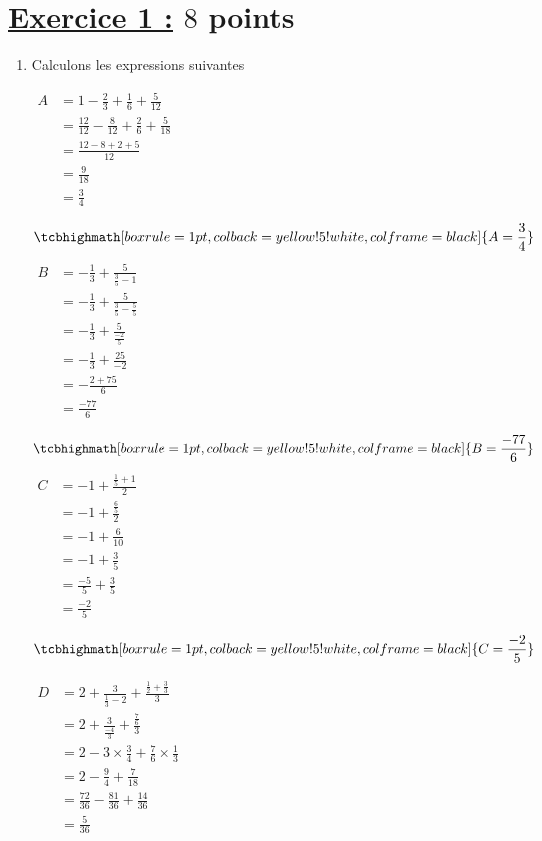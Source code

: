 \documentclass[12pt,a4paper]{article}
\begin{document}
\section*{\underline{Exercice 1 :} $8$ points}
\begin{enumerate}
    \item Calculons les expressions suivantes 
    
$
\begin{aligned}
A &= 1 - \frac{2}{3} + \frac{1}{6} + \frac{5}{12} \\
&= \frac{12}{12} - \frac{8}{12} + \frac{2}{6} + \frac{5}{18} \\
&= \frac{12-8+2+5}{12} \\
&= \frac{9}{18} \\
&= \frac{3}{4}
\end{aligned}
$

\[
\tcbhighmath[boxrule=1pt, colback=yellow!5!white, colframe=black]{ A = \frac{3}{4} }
\]
$
\begin{aligned}
B &= -\frac{1}{3} + \frac{5}{\frac{3}{5}-1} \\
&= -\frac{1}{3} + \frac{5}{\frac{3}{5}-\frac{5}{5}} \\
&= -\frac{1}{3} + \frac{5}{\frac{-2}{5}} \\
&= -\frac{1}{3} + \frac{25}{-2} \\
&= -\frac{2+75}{6} \\
&= \frac{-77}{6}
\end{aligned}
$

\[
\tcbhighmath[boxrule=1pt, colback=yellow!5!white, colframe=black]{ B = \frac{-77}{6} }
\]
$
\begin{aligned}
C &= -1 + \frac{\frac{1}{5}+1}{2} \\
&= -1 + \frac{\frac{6}{5}}{2} \\
&= -1 + \frac{6}{10} \\
&= -1 + \frac{3}{5} \\
&= \frac{-5}{5} + \frac{3}{5} \\
&= \frac{-2}{5}
\end{aligned}
$

\[
\tcbhighmath[boxrule=1pt, colback=yellow!5!white, colframe=black]{ C = \frac{-2}{5} }
\]

$\begin{aligned}
D &= 2 + \frac{3}{\frac{1}{3}-2} + \frac{\frac{1}{2}+\frac{3}{3}}{3} \\
&= 2 + \frac{3}{\frac{-4}{3}} + \frac{\frac{7}{6}}{3} \\
&= 2 - 3 \times \frac{3}{4} + \frac{7}{6} \times \frac{1}{3} \\
&= 2 - \frac{9}{4} + \frac{7}{18} \\
&= \frac{72}{36} - \frac{81}{36} + \frac{14}{36} \\
&= \frac{5}{36}
\end{aligned}$


\end{enumerate}
\end{document}
